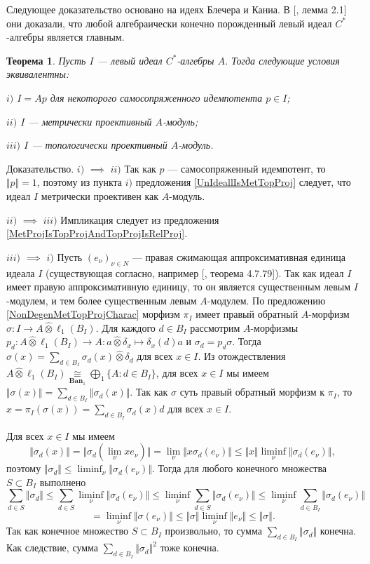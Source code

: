 \documentclass[12pt]{article}
\numberwithin{equation}{subsection}
\theoremstyle{plain}
\newtheorem{theorem}{Теорема}
\newenvironment{proof}{Доказательство.}{}
\newcommand{\projtens}{\mathbin{\widehat{\otimes}}}
\newcommand{\isom}[1]{\mathop{\mathbin{\cong}}\limits_{#1}}
\begin{document}
\begin{fulltext}
Следующее доказательство основано на идеях Блечера и Каниа. В [\cite{BleKanFinGenCStarAlgHilbMod}, лемма 2.1] они доказали, что любой алгебраически конечно порожденный левый идеал $C^*$-алгебры является главным.  

\begin{theorem}\label{LeftIdealOfCStarAlgMetTopProjCharac} Пусть $I$ --- левый идеал $C^*$-алгебры $A$. Тогда следующие условия эквивалентны:

$i)$ $I=Ap$ для некоторого самосопряженного идемпотента $p\in I$;

$ii)$ $I$ --- метрически проективный $A$-модуль;

$iii)$ $I$ --- топологически проективный $A$-модуль.
\end{theorem}
\begin{proof} $i)$ $\implies$ $ii)$ Так как $p$ --- самосопряженный идемпотент, то $\Vert p\Vert=1$, поэтому из пункта $i)$ предложения \ref{UnIdeallIsMetTopProj} следует, что идеал $I$ метрически проективен как $A$-модуль.

$ii)$ $\implies$ $iii)$ Импликация следует из предложения \ref{MetProjIsTopProjAndTopProjIsRelProj}.

$iii)$ $\implies$ $i)$ Пусть $(e_\nu)_{\nu\in N}$ --- правая сжимающая аппроксимативная единица идеала $I$ (существующая согласно, например [\cite{HelBanLocConvAlg}, теорема 4.7.79]). Так как идеал $I$ имеет правую аппроксимативную единицу, то он является существенным левым $I$-модулем, и тем более существенным левым $A$-модулем. По предложению \ref{NonDegenMetTopProjCharac} морфизм $\pi_I$ имеет правый обратный $A$-морфизм $\sigma:I\to A\projtens \ell_1(B_I)$. Для каждого $d\in B_I$ рассмотрим $A$-морфизмы $p_d:A\projtens \ell_1(B_I)\to A:a\projtens \delta_x\mapsto \delta_x(d)a$ и $\sigma_d=p_d\sigma$. Тогда $\sigma(x)=\sum_{d\in B_I}\sigma_d(x)\projtens \delta_d$ для всех $x\in I$. Из отождествления $A\projtens\ell_1(B_I)\isom{\mathbf{Ban}_1}\bigoplus_1\{ A:d\in B_I\}$, для всех $x\in I$ мы имеем $\Vert\sigma(x)\Vert=\sum_{d\in B_I} \Vert\sigma_d(x)\Vert$. Так как $\sigma$ суть правый обратный морфизм к $\pi_I$, то $x=\pi_I(\sigma(x))=\sum_{d\in B_I}\sigma_d(x)d$ для всех $x\in I$. 

Для всех $x\in I$ мы имеем
$$
\Vert\sigma_d(x)\Vert=\Vert\sigma_d(\lim_\nu xe_\nu)\Vert=\lim_\nu\Vert x\sigma_d(e_\nu)\Vert \leq\Vert x\Vert\liminf_\nu\Vert\sigma_d(e_\nu)\Vert,
$$ 
поэтому $\Vert\sigma_d\Vert\leq \liminf_\nu\Vert\sigma_d(e_\nu)\Vert$. Тогда для любого конечного множества $S\subset B_I$ выполнено
$$
\sum_{d\in S}\Vert \sigma_d\Vert
\leq \sum_{d\in S}\liminf_\nu\Vert \sigma_d(e_\nu)\Vert
\leq \liminf_\nu\sum_{d\in S}\Vert \sigma_d(e_\nu)\Vert
\leq \liminf_\nu\sum_{d\in B_I}\Vert \sigma_d(e_\nu) \Vert
$$
$$
=\liminf_{\nu}\Vert\sigma(e_\nu)\Vert
\leq \Vert\sigma\Vert\liminf_{\nu}\Vert e_\nu\Vert
\leq \Vert\sigma\Vert.
$$
Так как конечное множество $S\subset B_I$ произвольно, то сумма $\sum_{d\in B_I}\Vert\sigma_d\Vert$ конечна. Как следствие, сумма $\sum_{d\in B_I}\Vert\sigma_d\Vert^2$ тоже конечна. 


\end{proof}
\end{fulltext}
\end{document}
